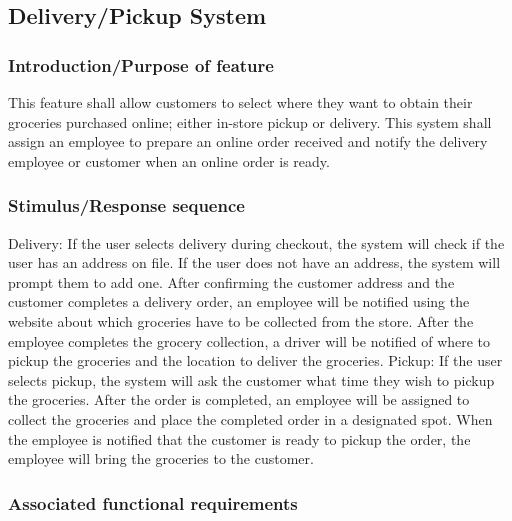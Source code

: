 \documentclass{scrreprt}
\theoremstyle{funreq}
\begin{document}
	\subsection{Delivery/Pickup System}
	\subsubsection{Introduction/Purpose of feature}
    This feature shall allow customers to select where they want to obtain their groceries purchased online; either in-store pickup or delivery. This system shall assign an employee to prepare an online order received and notify the delivery employee or customer when an online order is ready.

	\subsubsection{Stimulus/Response sequence}
	Delivery: If the user selects delivery during checkout, the system will check if the user has an address on file.  If the user does not have an address, the system will prompt them to add one.  After confirming the customer address and the customer completes a delivery order, an employee will be notified using the website about which groceries have to be collected from the store.  After the employee completes the grocery collection, a driver will be notified of where to pickup the groceries and the location to deliver the groceries.
	Pickup: If the user selects pickup, the system will ask the customer what time they wish to pickup the groceries.  After the order is completed, an employee will be assigned to collect the groceries and place the completed order in a designated spot.  When the employee is notified that the customer is ready to pickup the order, the employee will bring the groceries to the customer.
	\raggedbottom
	
	\subsubsection{Associated functional requirements}
\end{document}
